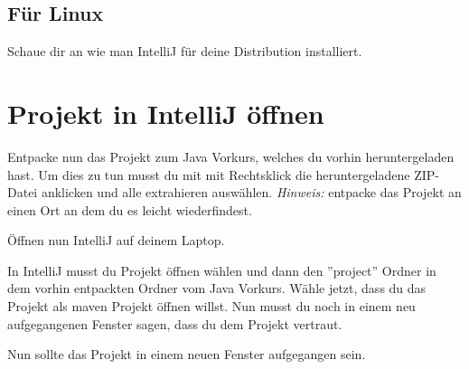 \subsection*{Für Linux}
Schaue dir an wie man IntelliJ für deine Distribution installiert.\newline

\section*{Projekt in IntelliJ öffnen}
Entpacke nun das Projekt zum Java Vorkurs, welches du vorhin heruntergeladen hast. Um dies zu tun musst du mit mit Rechtsklick die heruntergeladene ZIP-Datei anklicken und alle extrahieren auswählen. \textit{Hinweis:} entpacke das Projekt an einen Ort an dem du es leicht wiederfindest.\newline

Öffnen nun IntelliJ auf deinem Laptop.\newline

In IntelliJ musst du Projekt öffnen wählen und dann den ''project'' Ordner in dem vorhin entpackten Ordner vom Java Vorkurs. Wähle jetzt, dass du das Projekt als maven Projekt öffnen willst. Nun musst du noch in einem neu aufgegangenen Fenster sagen, dass du dem Projekt vertraut.\newline

Nun sollte das Projekt in einem neuen Fenster aufgegangen sein.\newline

